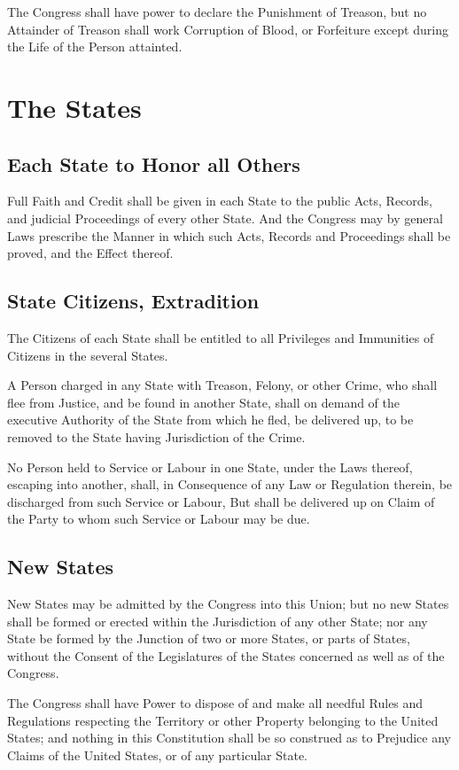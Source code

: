 \documentclass{constitution}
\begin{document}
The Congress shall have power to declare the Punishment of Treason,
but no Attainder of Treason shall work Corruption of Blood, or Forfeiture
except during the Life of the Person attainted.

\chapter{The States}
\section{Each State to Honor all Others}
Full Faith and Credit shall be given in each State
to the public Acts, Records, and judicial Proceedings of every other State.
And the Congress may by general Laws prescribe the Manner
in which such Acts, Records and Proceedings shall be proved, and the Effect thereof.

\section{State Citizens, Extradition}
The Citizens of each State shall be entitled
to all Privileges and Immunities of Citizens in the several States.

A Person charged in any State with Treason, Felony, or other Crime,
who shall flee from Justice, and be found in another State,
shall on demand of the executive Authority of the State from which he fled,
be delivered up, to be removed to the State having Jurisdiction of the Crime.

No Person held to Service or Labour in one State, under the Laws thereof,
escaping into another,
shall, in Consequence of any Law or Regulation therein,
be discharged from such Service or Labour,
But shall be delivered up on Claim of the Party to whom such Service or Labour may be due.

\section{New States}
New States may be admitted by the Congress into this Union;
but no new States shall be formed or erected within the Jurisdiction of any other State;
nor any State be formed by the Junction of two or more States, or parts of States,
without the Consent of the Legislatures of the States concerned as well as of the Congress.

The Congress shall have Power to dispose of and make all needful Rules and Regulations
respecting the Territory or other Property belonging to the United States;
and nothing in this Constitution shall be so construed
as to Prejudice any Claims of the United States, or of any particular State.
\end{document}
